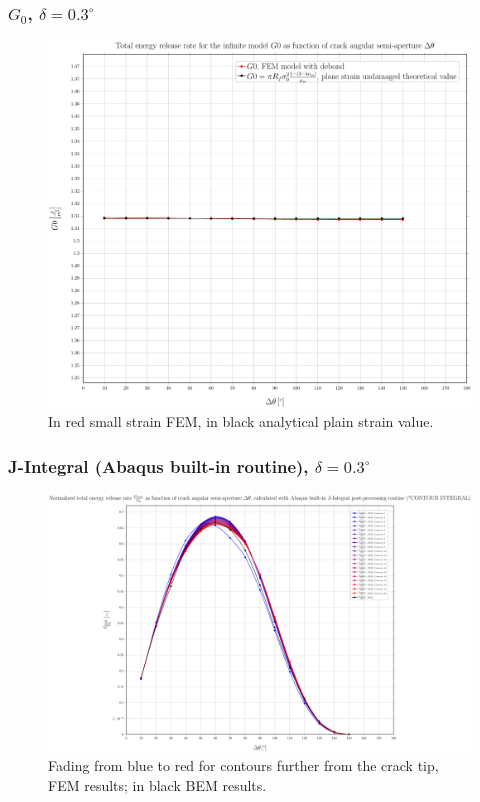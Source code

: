 \documentclass[first,firstsupp,lastsupp,handout,last,hyperref,table]{ETHclass}
\begin{document}
\begin{frame}
\frametitle{\small $G_{0}$, $\delta=0.3^{\circ}$}
\vspace{-0.5cm}
\centering
\captionsetup[figure]{font=scriptsize,labelfont=scriptsize}
\begin{figure}[!h]
\centering
\includegraphics[height=0.7\textheight]{2017-07-10_AbqRunSummary_SmallStrainD03_G0_Summary.pdf}
  \caption{\scriptsize In red small strain FEM, in black analytical plain strain value.}
  \label{fig:res1}
\end{figure}
\end{frame}

\begin{frame}
\frametitle{\small J-Integral (Abaqus built-in routine), $\delta=0.3^{\circ}$}
\vspace{-0.5cm}
\centering
\captionsetup[figure]{font=scriptsize,labelfont=scriptsize}
\begin{figure}[!h]
\centering
\includegraphics[height=0.7\textheight]{2017-07-10_AbqRunSummary_SmallStrainD03_J-INT_Summary.pdf}
  \caption{\scriptsize Fading from blue to red for contours further from the crack tip, FEM results; in black BEM results.}
  \label{fig:res1}
\end{figure}
\end{frame}
\end{document}
